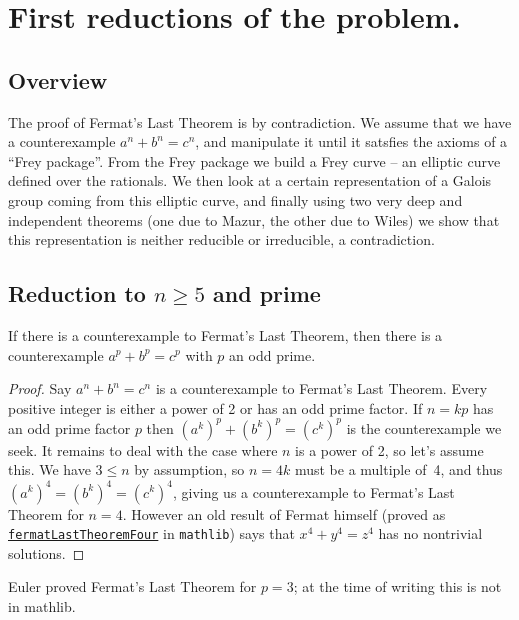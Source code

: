 \chapter{First reductions of the problem.}

\section{Overview}
The proof of Fermat's Last Theorem is by contradiction. We assume that we have a counterexample $a^n+b^n=c^n$, and manipulate it until it satsfies the axioms of a ``Frey package''. From the Frey package we build a Frey curve -- an elliptic curve defined over the rationals. We then look at a certain representation of a Galois group coming from this elliptic curve, and finally using two very deep and independent theorems (one due to Mazur, the other due to Wiles) we show that this representation is neither reducible or irreducible, a contradiction.

\section{Reduction to \texorpdfstring{$n\geq5$}{ngeq5} and prime}

\begin{lemma}\label{WLOG_n_prime}\leanok
  If there is a counterexample to Fermat's Last Theorem, then there is a counterexample $a^p+b^p=c^p$
  with $p$ an odd prime.
\end{lemma}
\begin{proof}\leanok
  Say $a^n + b^n = c^n$ is a counterexample to Fermat's Last Theorem. Every positive integer is either
  a power of 2 or has an odd prime factor. If $n=kp$ has an odd prime factor $p$ then
  $(a^k)^p+(b^k)^p=(c^k)^p$ is the counterexample we seek. It remains to deal with the case where
  $n$ is a power of 2, so let's assume this. We have $3\leq n$ by assumption, so
  $n=4k$ must be a multiple of~4, and thus $(a^k)^4=(b^k)^4=(c^k)^4$, giving us a counterexample
  to Fermat's Last Theorem for $n=4$. However an old result of Fermat himself (proved as \href{https://leanprover-community.github.io/mathlib4_docs/Mathlib/NumberTheory/FLT/Four.html#fermatLastTheoremFour}{\tt fermatLastTheoremFour} in {\tt mathlib}) says that $x^4+y^4=z^4$ has no nontrivial solutions.
\end{proof}

Euler proved Fermat's Last Theorem for $p=3$; at the time of writing this is not in mathlib.

